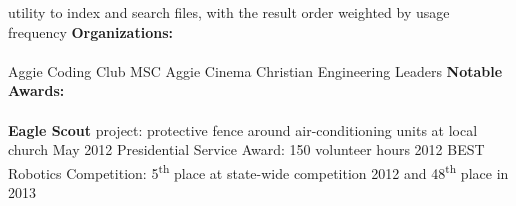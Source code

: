 \documentclass[12pt]{article}
\newcommand{\upspace}{\vspace{0px}}
\newcommand{\zzz}[1]{\upspace \0 \textbf{#1} \\ \vspace{-0.7\baselineskip} \hrulefill \vspace{-2px} \\ }
\newcommand{\aaa}{\upspace \1}
\newcommand{\bbb}{\upspace \2}
\begin{document}
\begin{flushleft}
\begin{outline}[compactitem]
		utility to index and search files, with the result order weighted by usage frequency
\zzz{Organizations:}
	\aaa Aggie Coding Club \hfill{}\hspace{1px} MSC Aggie Cinema \hfill{}\hspace{1px} Christian Engineering Leaders
\zzz{Notable Awards:}
	\aaa \textbf{Eagle Scout} project: protective fence around air-conditioning units at local church \hfill May 2012
	\aaa Presidential Service Award: 150 volunteer hours \hfill 2012
	\aaa BEST Robotics Competition: 5\textsuperscript{th} place at state-wide competition 2012 and 48\textsuperscript{th} place in 2013

\end{outline}
\end{flushleft}
\end{document}

